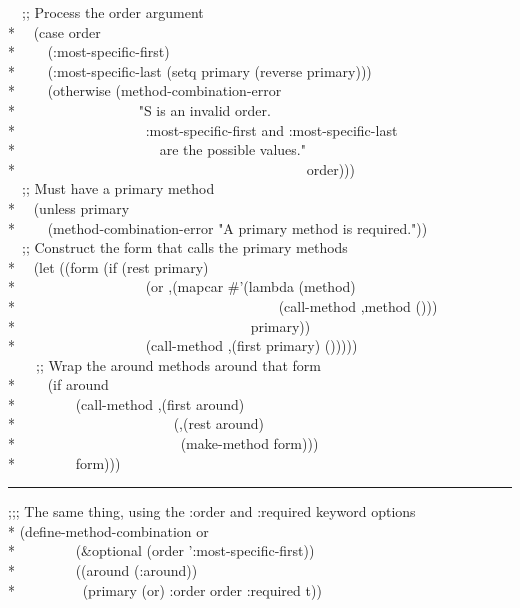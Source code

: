 \begin{defmac}
\begin{lisp}
~~;; Process the order argument \\*
~~(case order \\*
~~~~(:most-specific-first) \\*
~~~~(:most-specific-last (setq primary (reverse primary))) \\*
~~~~(otherwise (method-combination-error \\*
~~~~~~~~~~~~~~~~~"{\Xtilde}S is an invalid order.{\Xtilde}{\Xatsign} \\*
~~~~~~~~~~~~~~~~~~:most-specific-first and :most-specific-last {\Xtilde} \\*
~~~~~~~~~~~~~~~~~~~~are the possible values." \\*
~~~~~~~~~~~~~~~~~~~~~~~~~~~~~~~~~~~~~~~~~order))) \\
~~;; Must have a primary method \\*
~~(unless primary \\*
~~~~(method-combination-error "A primary method is required.")) \\
~~;; Construct the form that calls the primary methods \\*
~~(let ((form (if (rest primary) \\*
~~~~~~~~~~~~~~~~~~{\Xbq}(or ,{\Xatsign}(mapcar \#'(lambda (method) \\*
~~~~~~~~~~~~~~~~~~~~~~~~~~~~~~~~~~~~~{\Xbq}(call-method ,method ())) \\*
~~~~~~~~~~~~~~~~~~~~~~~~~~~~~~~~~primary)) \\*
~~~~~~~~~~~~~~~~~~{\Xbq}(call-method ,(first primary) ())))) \\
~~~~;; Wrap the around methods around that form \\*
~~~~(if around \\*
~~~~~~~~{\Xbq}(call-method ,(first around) \\*
~~~~~~~~~~~~~~~~~~~~~~(,{\Xatsign}(rest around) \\*
~~~~~~~~~~~~~~~~~~~~~~~(make-method form))) \\*
~~~~~~~~form)))
\end{lisp}
\hrule width 0pt\relax
\begin{lisp}
;;; The same thing, using the :order and :required keyword options \\*
(define-method-combination or  \\*
~~~~~~~~(\&optional (order ':most-specific-first)) \\*
~~~~~~~~((around (:around)) \\*
~~~~~~~~~(primary (or) :order order :required t)) \\

\end{lisp}
\end{defmac}
